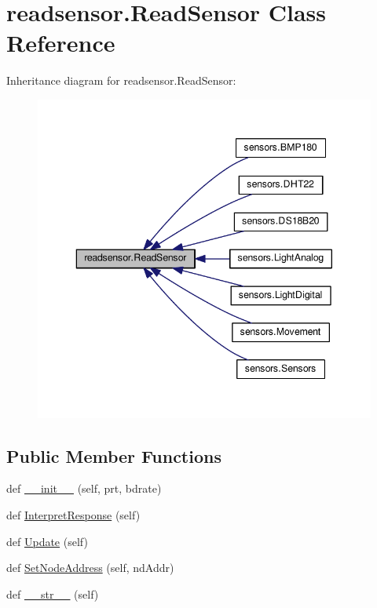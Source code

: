 \hypertarget{classreadsensor_1_1ReadSensor}{}\section{readsensor.\+Read\+Sensor Class Reference}
\label{classreadsensor_1_1ReadSensor}


Inheritance diagram for readsensor.\+Read\+Sensor\+:\nopagebreak
\begin{figure}[H]
\begin{center}
\leavevmode
\includegraphics[width=343pt]{classreadsensor_1_1ReadSensor__inherit__graph}
\end{center}
\end{figure}
\subsection*{Public Member Functions}
\begin{DoxyCompactItemize}
\item 
def \hyperlink{classreadsensor_1_1ReadSensor_a9c731b9cb06fd6b22f1f9d601ff292e3}{\+\_\+\+\_\+init\+\_\+\+\_\+} (self, prt, bdrate)
\item 
def \hyperlink{classreadsensor_1_1ReadSensor_af42ab8caf111db6f14d49cbcfad445c3}{Interpret\+Response} (self)
\item 
def \hyperlink{classreadsensor_1_1ReadSensor_a9eec15e8b601b447851376a2341cbe6e}{Update} (self)
\item 
def \hyperlink{classreadsensor_1_1ReadSensor_a23c251ae6bc0343f275e12199c35e0d2}{Set\+Node\+Address} (self, nd\+Addr)
\item 
def \hyperlink{classreadsensor_1_1ReadSensor_a52daa7fe6c6dba66b99d11a3c01567ba}{\+\_\+\+\_\+str\+\_\+\+\_\+} (self)
\end{DoxyCompactItemize}
